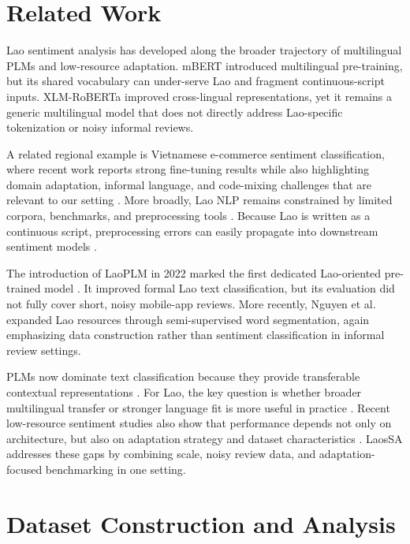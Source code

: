 \documentclass[conference, onecolumn]{IEEEtran}
\begin{document}
\section{Related Work}
\label{sec:related_work}

Lao sentiment analysis has developed along the broader trajectory of multilingual PLMs and low-resource adaptation. mBERT \cite{devlin2019bert} introduced multilingual pre-training, but its shared vocabulary can under-serve Lao and fragment continuous-script inputs. XLM-RoBERTa \cite{conneau2020unsupervised} improved cross-lingual representations, yet it remains a generic multilingual model that does not directly address Lao-specific tokenization or noisy informal reviews.

A related regional example is Vietnamese e-commerce sentiment classification, where recent work reports strong fine-tuning results while also highlighting domain adaptation, informal language, and code-mixing challenges that are relevant to our setting \cite{10.1007/978-3-032-21625-0_12}. More broadly, Lao NLP remains constrained by limited corpora, benchmarks, and preprocessing tools \cite{lin2022laoplm,nguyen2025semi}. Because Lao is written as a continuous script, preprocessing errors can easily propagate into downstream sentiment models \cite{nguyen2025semi}.

The introduction of LaoPLM in 2022 marked the first dedicated Lao-oriented pre-trained model \cite{lin2022laoplm}. It improved formal Lao text classification, but its evaluation did not fully cover short, noisy mobile-app reviews. More recently, Nguyen et al. \cite{nguyen2025semi} expanded Lao resources through semi-supervised word segmentation, again emphasizing data construction rather than sentiment classification in informal review settings.

PLMs now dominate text classification because they provide transferable contextual representations \cite{han2021pre,min2023recent}. For Lao, the key question is whether broader multilingual transfer or stronger language fit is more useful in practice \cite{lin2022laoplm,ruder2021xtreme,han2021pre}. Recent low-resource sentiment studies also show that performance depends not only on architecture, but also on adaptation strategy and dataset characteristics \cite{subramanian2025kec_tech_titans,chowdhury2025mysticciol,durairaj2025overview}. LaosSA addresses these gaps by combining scale, noisy review data, and adaptation-focused benchmarking in one setting.

\section{Dataset Construction and Analysis}
\label{sec:dataset}
\end{document}
